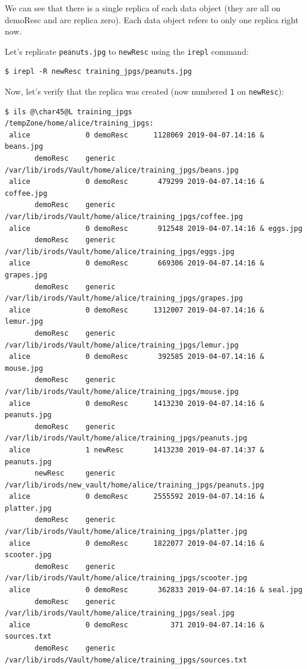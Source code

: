\documentclass[10pt,oneside]{memoir}
\begin{document}
We can see that there is a single replica of each data object (they are all on demoResc and are replica zero). Each data object refers to only one replica right now.

Let's replicate \texttt{peanuts.jpg} to \texttt{newResc} using the \texttt{irepl} command:

\begin{lstlisting}
$ irepl -R newResc training_jpgs/peanuts.jpg
\end{lstlisting}

Now, let's verify that the replica was created (now numbered \texttt{1} on \texttt{newResc}):

\begin{lstlisting}[basicstyle=\tiny\ttfamily]
$ ils @\char45@L training_jpgs
/tempZone/home/alice/training_jpgs:
 alice             0 demoResc      1128069 2019-04-07.14:16 & beans.jpg
       demoResc    generic    /var/lib/irods/Vault/home/alice/training_jpgs/beans.jpg
 alice             0 demoResc       479299 2019-04-07.14:16 & coffee.jpg
       demoResc    generic    /var/lib/irods/Vault/home/alice/training_jpgs/coffee.jpg
 alice             0 demoResc       912548 2019-04-07.14:16 & eggs.jpg
       demoResc    generic    /var/lib/irods/Vault/home/alice/training_jpgs/eggs.jpg
 alice             0 demoResc       669306 2019-04-07.14:16 & grapes.jpg
       demoResc    generic    /var/lib/irods/Vault/home/alice/training_jpgs/grapes.jpg
 alice             0 demoResc      1312007 2019-04-07.14:16 & lemur.jpg
       demoResc    generic    /var/lib/irods/Vault/home/alice/training_jpgs/lemur.jpg
 alice             0 demoResc       392585 2019-04-07.14:16 & mouse.jpg
       demoResc    generic    /var/lib/irods/Vault/home/alice/training_jpgs/mouse.jpg
 alice             0 demoResc      1413230 2019-04-07.14:16 & peanuts.jpg
       demoResc    generic    /var/lib/irods/Vault/home/alice/training_jpgs/peanuts.jpg
 alice             1 newResc       1413230 2019-04-07.14:37 & peanuts.jpg
       newResc     generic    /var/lib/irods/new_vault/home/alice/training_jpgs/peanuts.jpg
 alice             0 demoResc      2555592 2019-04-07.14:16 & platter.jpg
       demoResc    generic    /var/lib/irods/Vault/home/alice/training_jpgs/platter.jpg
 alice             0 demoResc      1822077 2019-04-07.14:16 & scooter.jpg
       demoResc    generic    /var/lib/irods/Vault/home/alice/training_jpgs/scooter.jpg
 alice             0 demoResc       362833 2019-04-07.14:16 & seal.jpg
       demoResc    generic    /var/lib/irods/Vault/home/alice/training_jpgs/seal.jpg
 alice             0 demoResc          371 2019-04-07.14:16 & sources.txt
       demoResc    generic    /var/lib/irods/Vault/home/alice/training_jpgs/sources.txt
\end{lstlisting}
\end{document}
